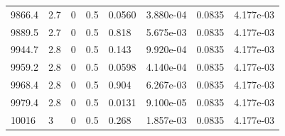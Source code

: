 \documentclass[preview]{standalone}
\begin{document}
{{{{{{{{{{\begin{tabular}{L{1.2cm}C{1.2cm} C{0.3cm}C{0.5cm} C{1.4cm}C{1.4cm} C{1.4cm}C{1.4cm}}
  9866.4  &   2.7  & 0     & 0.5 &  0.0560  & 3.880e-04  & 0.0835 &  4.177e-03   \\ 
  9889.5  &   2.7  & 0     & 0.5 &  0.818  & 5.675e-03  & 0.0835 &  4.177e-03   \\ 
  9944.7  &   2.8  & 0     & 0.5 &  0.143  & 9.920e-04  & 0.0835 &  4.177e-03   \\ 
  9959.2  &   2.8  & 0     & 0.5 &  0.0598  & 4.140e-04  & 0.0835 &  4.177e-03   \\ 
  9968.4  &   2.8  & 0     & 0.5 &  0.904  & 6.267e-03  & 0.0835 &  4.177e-03   \\ 
  9979.4  &   2.8  & 0     & 0.5 &  0.0131  & 9.100e-05  & 0.0835 &  4.177e-03   \\ 
  10016  &     3  & 0     & 0.5 &  0.268  & 1.857e-03  & 0.0835 &  4.177e-03   \\ 
\hline 
\end{tabular} 

}}}}}}}}}}
\end{document}
